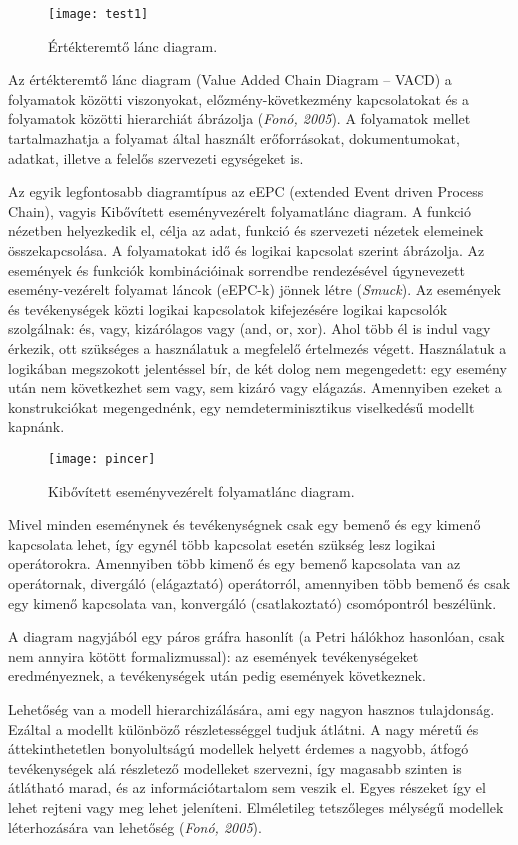 \documentclass[12pt]{article}
\begin{document}
\begin{wrapfigure}{r}{0.4\textwidth}
\texttt{[image: test1]}
\caption{Értékteremtő lánc diagram.}
\end{wrapfigure}

 Az értékteremtő lánc diagram (Value Added Chain Diagram – VACD) a folyamatok közötti viszonyokat, előzmény-következmény kapcsolatokat és a folyamatok közötti hierarchiát ábrázolja  (\textit{Fonó, 2005}). A folyamatok mellet tartalmazhatja a folyamat által használt erőforrásokat, dokumentumokat, adatkat, illetve a felelős szervezeti egységeket is.

Az egyik legfontosabb diagramtípus az eEPC (extended Event driven Process Chain), vagyis Kibővített eseményvezérelt folyamatlánc diagram. A funkció nézetben helyezkedik el, célja az adat, funkció és szervezeti nézetek elemeinek összekapcsolása. A folyamatokat idő és logikai kapcsolat szerint ábrázolja. Az események és funkciók kombinációinak sorrendbe rendezésével úgynevezett esemény-vezérelt folyamat láncok (eEPC-k) jönnek létre (\textit{Smuck}). Az események és tevékenységek közti logikai kapcsolatok kifejezésére logikai kapcsolók szolgálnak: és, vagy, kizárólagos vagy (and, or, xor). Ahol több él is indul vagy érkezik, ott szükséges a használatuk a megfelelő értelmezés végett. Használatuk a logikában megszokott jelentéssel bír, de két dolog nem megengedett: egy esemény után nem következhet sem vagy, sem kizáró vagy elágazás. Amennyiben ezeket a konstrukciókat megengednénk, egy nemdeterminisztikus viselkedésű modellt kapnánk.

\begin{figure}
\centering
\texttt{[image: pincer]}
\caption{ Kibővített eseményvezérelt folyamatlánc diagram.}
\end{figure}

Mivel minden eseménynek és tevékenységnek csak egy bemenő és egy kimenő kapcsolata lehet, így egynél több kapcsolat esetén szükség lesz logikai operátorokra. Amennyiben több kimenő és egy bemenő kapcsolata van az operátornak, divergáló (elágaztató) operátorról, amennyiben több bemenő és csak egy kimenő kapcsolata van, konvergáló (csatlakoztató) csomópontról beszélünk.

 A diagram nagyjából egy páros gráfra hasonlít (a Petri hálókhoz hasonlóan, csak nem annyira kötött formalizmussal): az események tevékenységeket eredményeznek, a tevékenységek után pedig események következnek.

Lehetőség van a modell hierarchizálására, ami egy nagyon hasznos tulajdonság. Ezáltal a modellt különböző részletességgel tudjuk átlátni. A nagy méretű és áttekinthetetlen bonyolultságú modellek helyett érdemes a nagyobb, átfogó tevékenységek alá részletező modelleket szervezni, így magasabb szinten is átlátható marad, és az információtartalom sem veszik el. Egyes részeket így el lehet rejteni vagy meg lehet jeleníteni. Elméletileg tetszőleges mélységű modellek léterhozására van lehetőség  (\textit{Fonó, 2005}).
\end{document}
